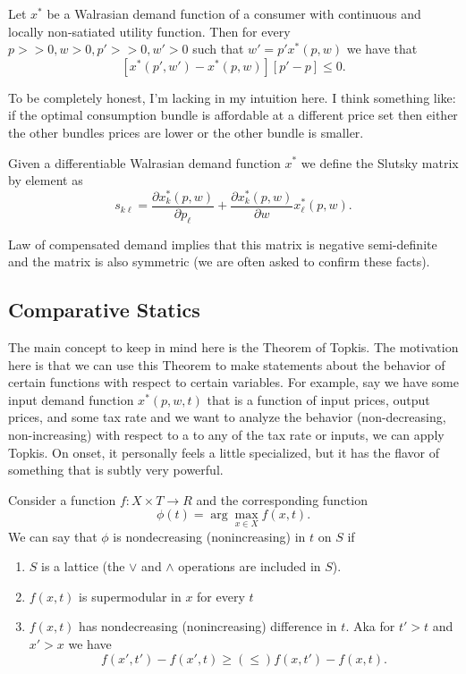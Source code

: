 \documentclass[11pt,english]{article}
\begin{document}
\begin{theorem}
Let $x^*$ be a Walrasian demand function of a consumer with continuous and locally non-satiated utility function. Then for every $p >> 0, w>0, p'>>0, w'> 0$ such that $w' = p'x^*(p,w)$ we have that $$[x^*(p',w') - x^*(p,w)][p'-p] \leq 0.$$
\end{theorem} To be completely honest, I'm lacking in my intuition here. I think something like: if the optimal consumption bundle is affordable at a different price set then either the other bundles prices are lower or the other bundle is smaller.

\begin{definition}
Given a differentiable Walrasian demand function $x^*$ we define the Slutsky matrix by element as $$s_{k\ell} = \frac{\partial x^*_k(p,w)}{\partial p_\ell} + \frac{\partial x^*_k(p,w)}{\partial w}x^*_\ell(p,w).$$
\end{definition} Law of compensated demand implies that this matrix is negative semi-definite and the matrix is also symmetric (we are often asked to confirm these facts).

\subsection{Comparative Statics}
The main concept to keep in mind here is the Theorem of Topkis. The motivation here is that we can use this Theorem to make statements about the behavior of certain functions with respect to certain variables. For example, say we have some input demand function $x^*(p,w,t)$ that is a function of input prices, output prices, and some tax rate and we want to analyze the behavior (non-decreasing, non-increasing) with respect to a to any of the tax rate or inputs, we can apply Topkis. On onset, it personally feels a little specialized, but it has the flavor of something that is subtly very powerful.

\begin{theorem}
Consider a function $f:X\times T \to R$ and the corresponding function $$\phi(t) = \arg\max_{x\in X}f(x,t).$$ We can say that $\phi$ is nondecreasing (nonincreasing) in $t$ on $S$ if
\begin{enumerate}
\item $S$ is a lattice (the $\lor$ and $\land$ operations are included in $S$).

\item $f(x,t)$ is supermodular in $x$ for every $t$

\item $f(x,t)$ has nondecreasing (nonincreasing) difference in $t$. Aka for $t' > t$ and $x' > x$ we have $$f(x',t') - f(x', t) \geq (\leq) f(x,t') - f(x, t).$$
\end{enumerate}
\end{theorem}
\end{document}
